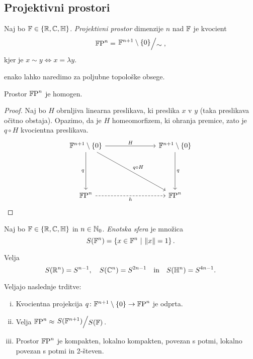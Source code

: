 \newpage

\subsection{Projektivni prostori}


\begin{definicija}
Naj bo $\mathbb{F} \in \left\{\mathbb{R}, \mathbb{C}, \mathbb{H}\right\}$.
\emph{Projektivni prostor}
dimenzije $n$ nad $\mathbb{F}$ je kvocient
\[
\proj{\F}{n} = \kvoc{\F^{n+1} \setminus \set{0}}{\sim},
\]
kjer je $x \sim y \iff x = \lambda y$.
\end{definicija}

\begin{opomba}
enako lahko naredimo za poljubne topološke obsege.
\end{opomba}

\begin{trditev}
Prostor $\mathbb{F}\!\operatorname{P}^{n}$ je homogen.
\end{trditev}

\begin{proof}
Naj bo $H$ obrnljiva linearna preslikava, ki preslika $x$ v $y$
(taka preslikava očitno obstaja). Opazimo, da je $H$ homeomorfizem,
ki ohranja premice, zato je $q \circ H$ kvocientna preslikava.
\[
\begin{tikzcd}[column sep=large, row sep=large]
\F^{n+1} \setminus \set{0}
\arrow[rr, "H"]
\arrow[dd, "q"']
\arrow[ddrr, "q \circ H"]
&& \F^{n+1} \setminus \set{0}
\arrow[dd, "q"] \\\\
\proj{\F}{n} \arrow[rr, dashrightarrow, "h"']
&& \proj{\F}{n}
\end{tikzcd} \qedhere
\]
\end{proof}

\begin{definicija}
Naj bo $\mathbb{F} \in \left\{\mathbb{R}, \mathbb{C}, \mathbb{H}\right\}$ in $n \in \mathbb{N}_0$.
\emph{Enotska sfera} je množica
\[
S(\mathbb{F}^n) = \left\{x \in \mathbb{F}^n~\middle\vert~\left\lVert x\right\rVert = 1\right\}.
\]
\end{definicija}

\begin{opomba}
Velja
\[
S(\mathbb{R}^n) = S^{n-1}, \quad
S(\mathbb{C}^n) = S^{2n - 1}
\quad \text{in} \quad
S(\mathbb{H}^n) = S^{4n - 1}.
\]
\end{opomba}

\begin{trditev}
Veljajo naslednje trditve:

\begin{enumerate}[i)]
\item Kvocientna projekcija
$q \colon \mathbb{F}^{n+1} \setminus \left\{0\right\} \to \mathbb{F}\!\operatorname{P}^{n}$ je odprta.
\item Velja $\proj{\F}{n} \approx \kvoc{S(\F^{n+1})}{S(\F)}$.
\item Prostor $\mathbb{F}\!\operatorname{P}^{n}$ je kompakten, lokalno kompakten,
povezan s potmi, lokalno povezan s potmi in 2-števen.

\end{enumerate}
\end{trditev}

